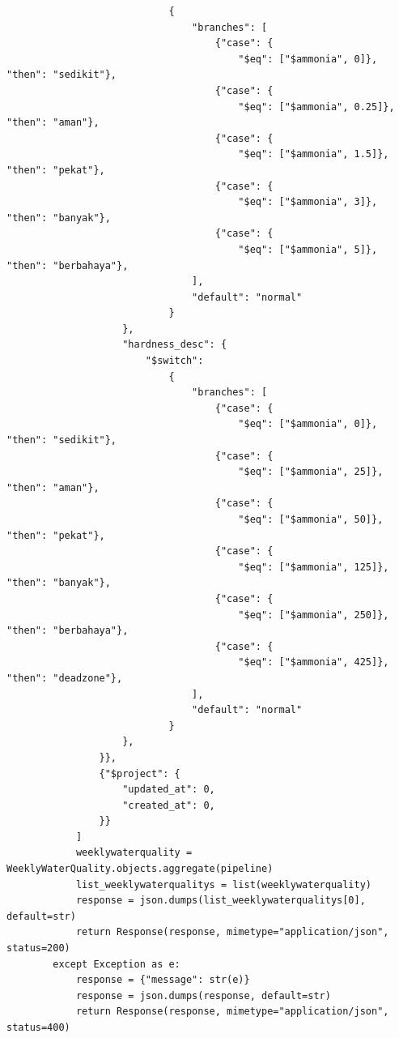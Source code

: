\begin{enumerate}[1.]
\begin{lstlisting}
                            {
                                "branches": [
                                    {"case": {
                                        "$eq": ["$ammonia", 0]}, "then": "sedikit"},
                                    {"case": {
                                        "$eq": ["$ammonia", 0.25]}, "then": "aman"},
                                    {"case": {
                                        "$eq": ["$ammonia", 1.5]}, "then": "pekat"},
                                    {"case": {
                                        "$eq": ["$ammonia", 3]}, "then": "banyak"},
                                    {"case": {
                                        "$eq": ["$ammonia", 5]}, "then": "berbahaya"},
                                ],
                                "default": "normal"
                            }
                    },
                    "hardness_desc": {
                        "$switch":
                            {
                                "branches": [
                                    {"case": {
                                        "$eq": ["$ammonia", 0]}, "then": "sedikit"},
                                    {"case": {
                                        "$eq": ["$ammonia", 25]}, "then": "aman"},
                                    {"case": {
                                        "$eq": ["$ammonia", 50]}, "then": "pekat"},
                                    {"case": {
                                        "$eq": ["$ammonia", 125]}, "then": "banyak"},
                                    {"case": {
                                        "$eq": ["$ammonia", 250]}, "then": "berbahaya"},
                                    {"case": {
                                        "$eq": ["$ammonia", 425]}, "then": "deadzone"},
                                ],
                                "default": "normal"
                            }
                    },
                }},
                {"$project": {
                    "updated_at": 0,
                    "created_at": 0,
                }}
            ]
            weeklywaterquality = WeeklyWaterQuality.objects.aggregate(pipeline)
            list_weeklywaterqualitys = list(weeklywaterquality)
            response = json.dumps(list_weeklywaterqualitys[0], default=str)
            return Response(response, mimetype="application/json", status=200)
        except Exception as e:
            response = {"message": str(e)}
            response = json.dumps(response, default=str)
            return Response(response, mimetype="application/json", status=400)
\end{lstlisting}



\end{enumerate}
